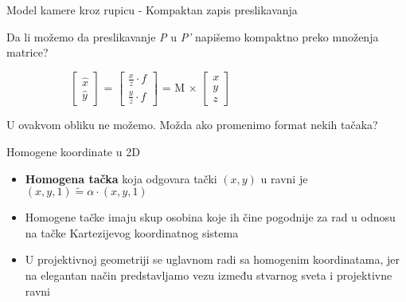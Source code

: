 \documentclass[bookmarks=true,bookmarksopen=true,pdfborder={0 0 0},pdfhighlight={/N},linkbordercolor={.5 .5 .5},implicit=false,unicode,xcolor={table}]{beamer}
\begin{document}
\begin{frame}{Model kamere kroz rupicu - Kompaktan zapis preslikavanja}

  Da li možemo da preslikavanje \textit{P} u \textit{P'} napišemo kompaktno preko množenja matrice?
  \begin{figure}
    \begin{subfigure}{6cm}
      $\begin{bmatrix}
        \hat{x}\\
        \hat{y}
      \end{bmatrix}$
      = $\begin{bmatrix}
        \frac{x}{z} \cdot f\\
        \frac{y}{z} \cdot f
      \end{bmatrix}$
      = M $\times$
      $\begin{bmatrix}
        x\\
        y\\
        z
      \end{bmatrix}$
    \end{subfigure}
  \end{figure}
  U ovakvom obliku ne možemo. Možda ako promenimo format nekih tačaka?


\end{frame}

\begin{frame}{Homogene koordinate u 2D}

\begin{itemize}
  \item \textbf{Homogena tačka} koja odgovara tački $(x, y)$ u ravni je $(x, y, 1) \tilde{=} \alpha \cdot (x, y, 1)$ 
  \item Homogene tačke imaju skup osobina koje ih čine pogodnije za rad u odnosu na tačke Kartezijevog koordinatnog sistema
  \item U projektivnoj geometriji se uglavnom radi sa homogenim koordinatama, jer na elegantan način predstavljamo
        vezu između stvarnog sveta i projektivne ravni
\end{itemize}

\end{frame}
\end{document}
